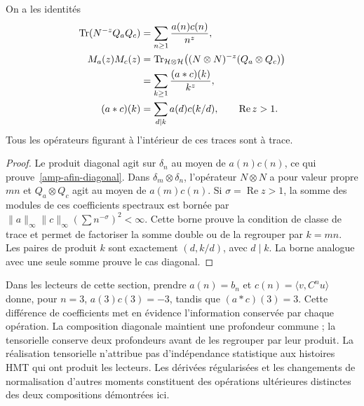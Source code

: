 \begin{proposition}
\label{amp-afin-prop-productos}
On a les identités
\begin{align}
 \operatorname{Tr}(N^{-z}Q_aQ_c)
 &=\sum_{n\geq1}\frac{a(n)c(n)}{n^z},
 \label{amp-afin-diagonal}\\
 M_a(z)M_c(z)
 &=\operatorname{Tr}_{\mathcal H\otimes\mathcal H}
 \bigl((N\otimes N)^{-z}(Q_a\otimes Q_c)\bigr)\notag\\
 &=\sum_{k\geq1}\frac{(a*c)(k)}{k^z},
 \label{amp-afin-tensor}\\
 (a*c)(k)&=\sum_{d\mid k}a(d)c(k/d),
 \qquad \operatorname{Re}z>1.
 \label{amp-afin-convolucion}
\end{align}
Tous les opérateurs figurant à l’intérieur de ces traces sont à trace.
\end{proposition}
\begin{proof}
Le produit diagonal agit sur $\delta_n$ au moyen de
$a(n)c(n)$, ce qui prouve~\eqref{amp-afin-diagonal}.
Dans $\delta_m\otimes\delta_n$, l’opérateur $N\otimes N$
a pour valeur propre $mn$ et $Q_a\otimes Q_c$ agit au moyen de
$a(m)c(n)$. Si $\sigma=\operatorname{Re}z>1$, la somme des
modules de ces coefficients spectraux est bornée par
$\|a\|_\infty\|c\|_\infty(\sum n^{-\sigma})^2<\infty$.
Cette borne prouve la condition de classe de trace et permet de factoriser
la somme double ou de la regrouper par $k=mn$. Les paires de produit $k$
sont exactement $(d,k/d)$, avec $d\mid k$.
La borne analogue avec une seule somme prouve le cas diagonal.
\end{proof}

Dans les lecteurs de cette section, prendre $a(n)=b_n$ et
$c(n)=\langle v,C^nu\rangle$ donne, pour $n=3$,
$a(3)c(3)=-3$, tandis que $(a*c)(3)=3$.
Cette différence de coefficients met en évidence l’information conservée par
chaque opération. La composition diagonale maintient une profondeur commune ;
la tensorielle conserve deux profondeurs avant de les regrouper par leur produit.
La réalisation tensorielle n’attribue pas d’indépendance statistique aux
histoires HMT qui ont produit les lecteurs. Les dérivées régularisées et
les changements de normalisation d’autres moments constituent des opérations
ultérieures distinctes des deux compositions démontrées ici.
